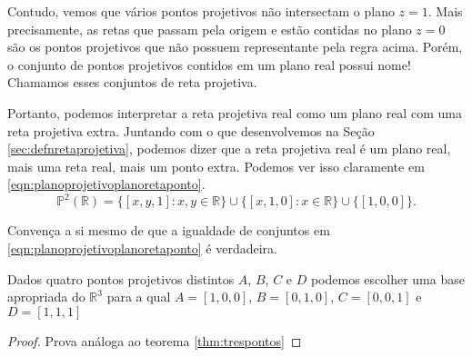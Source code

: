 Contudo, vemos que vários pontos projetivos não intersectam o plano \(z = 1\).
Mais precisamente, as retas que passam pela origem e estão contidas no plano \(z = 0\) são os pontos projetivos que não possuem representante pela regra acima.
Porém, o conjunto de pontos projetivos contidos em um plano real possui nome!
Chamamos esses conjuntos de reta projetiva.

Portanto, podemos interpretar a reta projetiva real como um plano real com uma reta projetiva extra.
Juntando com o que desenvolvemos na Seção \ref{sec:defnretaprojetiva}, podemos dizer que a reta projetiva real é um plano real, mais uma reta real, mais um ponto extra.
Podemos ver isso claramente em \ref{eqn:planoprojetivoplanoretaponto}.
\begin{equation} \label{eqn:planoprojetivoplanoretaponto}
  \mathbb{P}^2(\mathbb{R}) = \{ [x, y, 1] : x, y \in \mathbb{R} \} \cup \{[x, 1, 0] : x \in \mathbb{R}\} \cup \{[1, 0, 0]\}.
\end{equation}

\begin{exer}
  Convença a si mesmo de que a igualdade de conjuntos em \ref{eqn:planoprojetivoplanoretaponto} é verdadeira.
\end{exer}

\begin{thm} \label{thm:quatropontos}
  Dados quatro pontos projetivos distintos \(A\), \(B\), \(C\) e \(D\) podemos escolher uma base apropriada do \(\mathbb{R}^3\) para a qual \(A = [1, 0, 0]\),  \(B = [0, 1, 0]\), \(C = [0, 0, 1]\) e \( D = [1, 1, 1]\)
\end{thm}
\begin{proof}
Prova análoga ao teorema \ref{thm:trespontos}
\end{proof}

